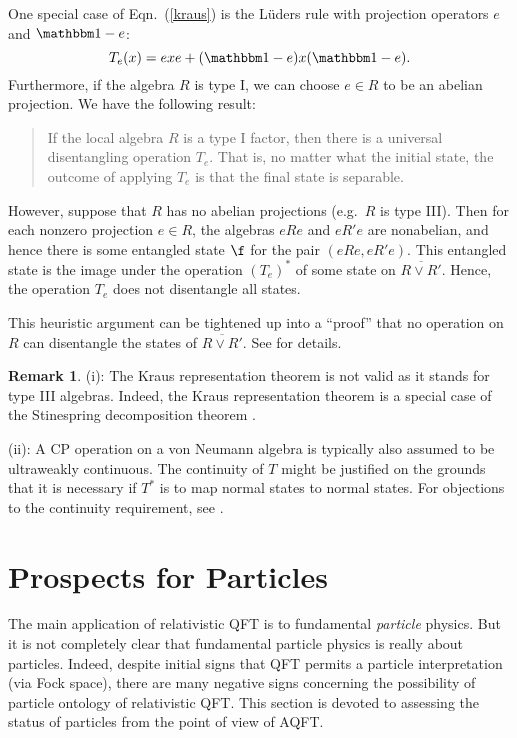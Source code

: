 \documentclass[12pt]{article}
\theoremstyle{definition}
\theoremstyle{definition}
\newtheorem{note}[thm]{Remark}
\theoremstyle{remark}
\def\8#1{{\mathbbm #1}}
\begin{document}
\noindent One special case of Eqn.\ (\ref{kraus}) is the L{\"u}ders
rule with projection operators $e$ and $\81 -e$:
$$ T_e(x)=exe+(\81 -e)x(\81 -e) .$$
Furthermore, if the algebra $R$ is type I, we can
choose $e\in R$ to be an abelian projection.  We have
the following result:
\begin{quote} If the local algebra $R$ is a type I factor, then there
  is a universal disentangling operation $T_e$.  That is, no matter
  what the initial state, the outcome of applying $T_e$ is that the
  final state is separable.
\end{quote} However, suppose that $R$ has no abelian projections
(e.g.\ $R$ is type III).  Then for each nonzero projection $e\in R$,
the algebras $eRe$ and $eR'e$ are nonabelian, and hence there is some
entangled state $\f$ for the pair $(eRe,eR'e)$.  This entangled state
is the image under the operation $(T_e)^*$ of some state on
$\overline{R\vee R'}$.  Hence, the operation $T_e$ does not
disentangle all states.

This heuristic argument can be tightened up into a ``proof'' that no
operation on $R$ can disentangle the states of $\overline{R\vee R'}$.
See \cite{clif} for details.

\begin{note} (i): The Kraus representation theorem is not valid as it
  stands for type III algebras.  Indeed, the Kraus representation
  theorem is a special case of the Stinespring decomposition theorem
  \cite{sti}.

  (ii): A CP operation on a von Neumann algebra is typically also
  assumed to be ultraweakly continuous.  The continuity of $T$ might
  be justified on the grounds that it is necessary if $T^*$ is to map
  normal states to normal states.  For objections to the continuity
  requirement, see \cite{sri}.
\end{note}





\section{Prospects for Particles} \label{parts}

The main application of relativistic QFT is to fundamental
\emph{particle} physics.  But it is not completely clear that
fundamental particle physics is really about particles.  Indeed,
despite initial signs that QFT permits a particle interpretation (via
Fock space), there are many negative signs concerning the possibility
of particle ontology of relativistic QFT.  This section is devoted to
assessing the status of particles from the point of view of AQFT.
\end{document}
